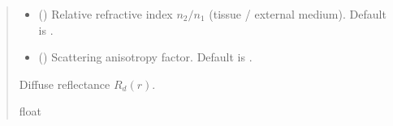 \documentclass[letterpaper,10pt,english]{sphinxmanual}
\begin{document}
\begin{fulllineitems}
\begin{quote}
\begin{description}
\begin{itemize}
\item {} 
\sphinxAtStartPar
{} (\sphinxstyleliteralemphasis{\sphinxupquote{, }}) \textendash{} Relative refractive index \(n_2/n_1\) (tissue / external medium). Default is .

\item {} 
\sphinxAtStartPar
{} (\sphinxstyleliteralemphasis{\sphinxupquote{, }}) \textendash{} Scattering anisotropy factor. Default is .

\end{itemize}

\sphinxAtStartPar
Diffuse reflectance \(R_d(r)\).

\sphinxAtStartPar
float

\end{description}\end{quote}



\end{fulllineitems}
\end{document}
